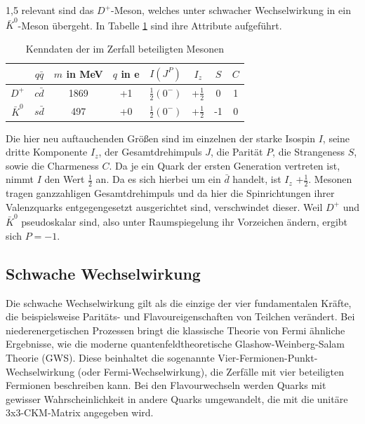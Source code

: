 \documentclass[11pt,a4paper,twoside]{report}
\begin{document}
\begin{spacing}{1,5}
relevant sind das $D^+$-Meson, welches unter schwacher Wechselwirkung in ein $\bar K^0$-Meson übergeht. In Tabelle \ref{tab_DKMeson} sind ihre Attribute
aufgeführt.
\begin{table}[H]
\begin{tabular}{c|ccc|cccc} \toprule 
  & $q\bar q$ &  $m$ in MeV & $q$ in e & $I(J^P)$ & $I_z$ & $S$ & $C$\\
 \midrule
  $D^+$ & $c\bar d$ & 1869  & +1 & $\frac12(0^-)$ & +$\frac12$ & 0 & 1\\
 $\bar K^0$ & $s\bar d$ & 497  & +0 & $\frac12(0^-)$ & +$\frac12$ & -1& 0
\\\bottomrule \bottomrule
 \end{tabular}
\caption{Kenndaten der im Zerfall beteiligten Mesonen}
\label{tab_DKMeson}
\end{table}
\noindent
Die hier neu auftauchenden Größen sind im einzelnen der starke Isospin $I$, seine dritte Komponente $I_z$, der Gesamtdrehimpuls $J$, die Parität $P$, die
Strangeness $S$, sowie die Charmeness $C$. Da je ein Quark der ersten Generation vertreten ist, nimmt $I$ den Wert $\frac12$ an. Da es sich hierbei um ein 
$\bar d$ handelt, ist $I_z$ $+\frac12$. Mesonen tragen ganzzahligen Gesamtdrehimpuls und da hier die Spinrichtungen ihrer Valenzquarks entgegengesetzt 
ausgerichtet sind, verschwindet dieser. Weil $D^+$ und $\bar K^0$ pseudoskalar sind, also unter Raumspiegelung ihr Vorzeichen ändern, ergibt sich $P=-1$.

\subsection{Schwache Wechselwirkung}
\label{sec_schwacheWW}
Die schwache Wechselwirkung gilt als die einzige der vier fundamentalen Kräfte, die beispielsweise Paritäts- und Flavoureigenschaften von Teilchen verändert.
Bei niederenergetischen Prozessen bringt die klassische Theorie von Fermi ähnliche Ergebnisse, wie die moderne quantenfeldtheoretische Glashow-Weinberg-Salam 
Theorie (GWS). Diese beinhaltet die
sogenannte Vier-Fermionen-Punkt-Wechselwirkung (oder Fermi-Wechselwirkung), die Zerfälle mit vier beteiligten Fermionen beschreiben kann. Bei den 
Flavourwechseln werden Quarks mit gewisser Wahrscheinlichkeit in andere Quarks umgewandelt, die mit die unitäre 3x3-CKM-Matrix angegeben wird. 


\end{spacing}
\end{document}
